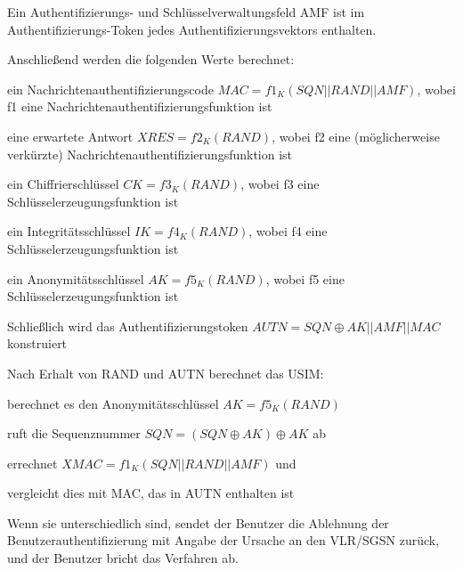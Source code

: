 \documentclass[a4paper]{article}
\begin{document}
\begin{multicols}{3}
\begin{itemize*}
\begin{itemize*}
\begin{itemize*}
                  \end{itemize*}
                  \item Ein Authentifizierungs- und Schlüsselverwaltungsfeld AMF ist im Authentifizierungs-Token jedes Authentifizierungsvektors enthalten.
                  \item Anschließend werden die folgenden Werte berechnet:
                  \begin{itemize*}
                        \item ein Nachrichtenauthentifizierungscode $MAC = f1_K(SQN || RAND || AMF)$, wobei f1 eine Nachrichtenauthentifizierungsfunktion ist
                        \item eine erwartete Antwort $XRES = f2_K(RAND)$, wobei f2 eine (möglicherweise verkürzte) Nachrichtenauthentifizierungsfunktion ist
                        \item ein Chiffrierschlüssel $CK = f3_K(RAND)$, wobei f3 eine Schlüsselerzeugungsfunktion ist
                        \item ein Integritätsschlüssel $IK = f4_K(RAND)$, wobei f4 eine Schlüsselerzeugungsfunktion ist
                        \item ein Anonymitätsschlüssel $AK = f5_K(RAND)$, wobei f5 eine Schlüsselerzeugungsfunktion ist
                  \end{itemize*}
                  \item Schließlich wird das Authentifizierungstoken $AUTN = SQN \oplus AK || AMF || MAC$ konstruiert
            \end{itemize*}
            \begin{itemize*}
                  \item Nach Erhalt von RAND und AUTN berechnet das USIM:
                  \item berechnet es den Anonymitätsschlüssel $AK = f5_K (RAND)$
                  \item ruft die Sequenznummer $SQN = (SQN \oplus AK) \oplus AK$ ab
                  \item errechnet $XMAC = f1_K (SQN || RAND || AMF)$ und
                  \item vergleicht dies mit MAC, das in AUTN enthalten ist
                  \item Wenn sie unterschiedlich sind, sendet der Benutzer die Ablehnung der Benutzerauthentifizierung mit Angabe der Ursache an den VLR/SGSN zurück, und der Benutzer bricht das Verfahren ab.

\end{itemize*}
\end{itemize*}
\end{multicols}
\end{document}
